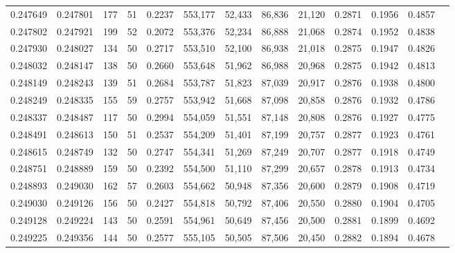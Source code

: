 \begin{tabular}{rrrrrrrrrrrrr}
0.247649 & 0.247801 &   177 &  51 &                                     0.2237 & 553,177 &  52,433 &  86,836 &  21,120 & 0.2871 & 0.1956 & 0.4857 \\
0.247802 & 0.247921 &   199 &  52 &                                     0.2072 & 553,376 &  52,234 &  86,888 &  21,068 & 0.2874 & 0.1952 & 0.4838 \\
0.247930 & 0.248027 &   134 &  50 &                                     0.2717 & 553,510 &  52,100 &  86,938 &  21,018 & 0.2875 & 0.1947 & 0.4826 \\
0.248032 & 0.248147 &   138 &  50 &                                     0.2660 & 553,648 &  51,962 &  86,988 &  20,968 & 0.2875 & 0.1942 & 0.4813 \\
0.248149 & 0.248243 &   139 &  51 &                                     0.2684 & 553,787 &  51,823 &  87,039 &  20,917 & 0.2876 & 0.1938 & 0.4800 \\
0.248249 & 0.248335 &   155 &  59 &                                     0.2757 & 553,942 &  51,668 &  87,098 &  20,858 & 0.2876 & 0.1932 & 0.4786 \\
0.248337 & 0.248487 &   117 &  50 &                                     0.2994 & 554,059 &  51,551 &  87,148 &  20,808 & 0.2876 & 0.1927 & 0.4775 \\
0.248491 & 0.248613 &   150 &  51 &                                     0.2537 & 554,209 &  51,401 &  87,199 &  20,757 & 0.2877 & 0.1923 & 0.4761 \\
0.248615 & 0.248749 &   132 &  50 &                                     0.2747 & 554,341 &  51,269 &  87,249 &  20,707 & 0.2877 & 0.1918 & 0.4749 \\
0.248751 & 0.248889 &   159 &  50 &                                     0.2392 & 554,500 &  51,110 &  87,299 &  20,657 & 0.2878 & 0.1913 & 0.4734 \\
0.248893 & 0.249030 &   162 &  57 &                                     0.2603 & 554,662 &  50,948 &  87,356 &  20,600 & 0.2879 & 0.1908 & 0.4719 \\
0.249030 & 0.249126 &   156 &  50 &                                     0.2427 & 554,818 &  50,792 &  87,406 &  20,550 & 0.2880 & 0.1904 & 0.4705 \\
0.249128 & 0.249224 &   143 &  50 &                                     0.2591 & 554,961 &  50,649 &  87,456 &  20,500 & 0.2881 & 0.1899 & 0.4692 \\
0.249225 & 0.249356 &   144 &  50 &                                     0.2577 & 555,105 &  50,505 &  87,506 &  20,450 & 0.2882 & 0.1894 & 0.4678 \\

\end{tabular}
